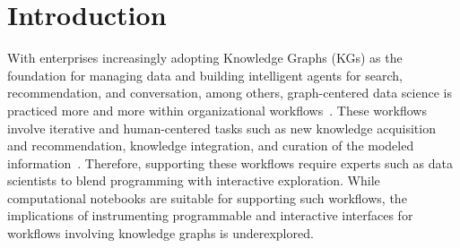 \section{Introduction}
With enterprises increasingly adopting Knowledge Graphs (KGs) as the foundation for managing data and building intelligent agents for search, recommendation, and conversation, among others, graph-centered data science is practiced more and more within organizational workflows~\cite{gutierrez2021knowledge}.
These workflows involve iterative and human-centered tasks such as new knowledge acquisition and recommendation, knowledge integration, and curation of the modeled information~\cite{ilyas2022saga, bharadwaj2017creation, knowledgevault, haase2019metaphactory}. 
Therefore, supporting these workflows require experts such as data scientists to blend programming with interactive exploration.
While computational notebooks are suitable for supporting such workflows, the implications of instrumenting programmable and interactive interfaces 
for workflows involving knowledge graphs is underexplored.

